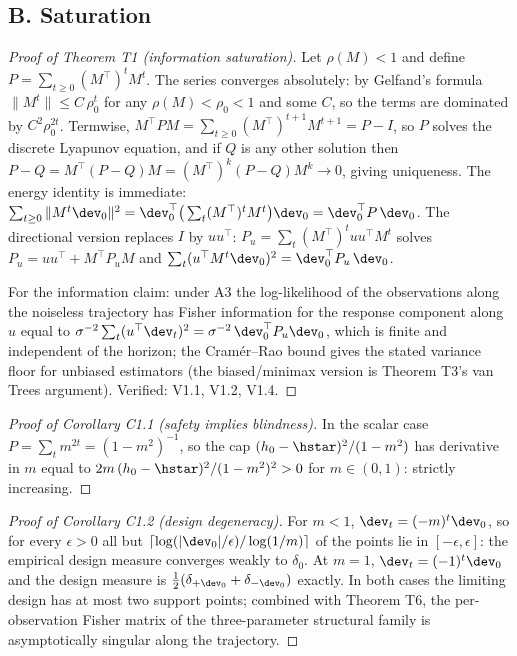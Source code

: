 \subsection*{B. Saturation}

\begin{proof}[Proof of Theorem T1 (information saturation)]
Let $\rho(M) < 1$ and define $P = \sum_{t\ge 0} (M^\top)^t M^t$. The series
converges absolutely: by Gelfand's formula $\|M^t\| \le C\,\rho_0^t$ for any
$\rho(M) < \rho_0 < 1$ and some $C$, so the terms are dominated by
$C^2\rho_0^{2t}$. Termwise,
$M^\top P M = \sum_{t \ge 0} (M^\top)^{t+1}M^{t+1} = P - I$, so $P$ solves
the discrete Lyapunov equation, and if $Q$ is any other solution then
$P - Q = M^\top (P-Q) M = (M^\top)^k (P-Q) M^k \to 0$, giving uniqueness.
The energy identity is immediate:
$\sum_{t\ge 0} \|M^t \dev_0\|^2 = \dev_0^\top \big(\sum_t (M^\top)^t M^t\big)
\dev_0 = \dev_0^\top P\,\dev_0$. The directional version replaces $I$ by
$uu^\top$: $P_u = \sum_t (M^\top)^t uu^\top M^t$ solves
$P_u = uu^\top + M^\top P_u M$ and
$\sum_t (u^\top M^t \dev_0)^2 = \dev_0^\top P_u\,\dev_0$.

For the information claim: under A3 the log-likelihood of the observations
along the noiseless trajectory has Fisher information for the response
component along $u$ equal to $\sigma^{-2}\sum_t (u^\top \dev_t)^2 =
\sigma^{-2}\,\dev_0^\top P_u \dev_0$, which is finite and independent of the
horizon; the Cram\'er--Rao bound gives the stated variance floor for
unbiased estimators (the biased/minimax version is Theorem T3's van Trees
argument). Verified: V1.1, V1.2, V1.4.
\end{proof}

\begin{proof}[Proof of Corollary C1.1 (safety implies blindness)]
In the scalar case $P = \sum_t m^{2t} = (1-m^2)^{-1}$, so the cap
$(h_0-\hstar)^2/(1-m^2)$ has derivative in $m$ equal to
$2m\,(h_0-\hstar)^2/(1-m^2)^2 > 0$ for $m \in (0,1)$: strictly increasing.
\end{proof}

\begin{proof}[Proof of Corollary C1.2 (design degeneracy)]
For $m < 1$, $\dev_t = (-m)^t \dev_0$, so for every $\epsilon > 0$ all but
$\lceil \log(|\dev_0|/\epsilon)/\log(1/m)\rceil$ of the points lie in
$[-\epsilon, \epsilon]$: the empirical design measure converges weakly to
$\delta_0$. At $m = 1$, $\dev_t = (-1)^t \dev_0$ and the design measure is
$\tfrac{1}{2}(\delta_{+\dev_0} + \delta_{-\dev_0})$ exactly. In both cases
the limiting design has at most two support points; combined with Theorem
T6, the per-observation Fisher matrix of the three-parameter structural
family is asymptotically singular along the trajectory.
\end{proof}

